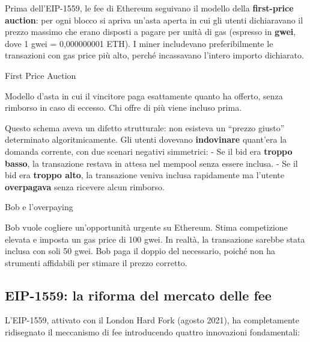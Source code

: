 \documentclass[
  italian,
  openany]{book}
\begin{document}
Prima dell'EIP-1559, le fee di Ethereum seguivano il modello della
\textbf{first-price auction}: per ogni blocco si apriva un'asta aperta
in cui gli utenti dichiaravano il prezzo massimo che erano disposti a
pagare per unità di gas (espresso in \textbf{gwei}, dove 1 gwei =
0,000000001 ETH). I miner includevano preferibilmente le transazioni con
gas price più alto, perché incassavano l'intero importo dichiarato.

\begin{calloutdefinition}{First Price Auction}

Modello d'asta in cui il vincitore paga esattamente quanto ha offerto,
senza rimborso in caso di eccesso. Chi offre di più viene incluso prima.

\end{calloutdefinition}

Questo schema aveva un difetto strutturale: non esisteva un ``prezzo
giusto'' determinato algoritmicamente. Gli utenti dovevano
\textbf{indovinare} quant'era la domanda corrente, con due scenari
negativi simmetrici: - Se il bid era \textbf{troppo basso}, la
transazione restava in attesa nel mempool senza essere inclusa. - Se il
bid era \textbf{troppo alto}, la transazione veniva inclusa rapidamente
ma l'utente \textbf{overpagava} senza ricevere alcun rimborso.

\begin{callouttip}{Bob e l’overpaying}

Bob vuole cogliere un'opportunità urgente su Ethereum. Stima
competizione elevata e imposta un gas price di 100 gwei. In realtà, la
transazione sarebbe stata inclusa con soli 50 gwei. Bob paga il doppio
del necessario, poiché non ha strumenti affidabili per stimare il prezzo
corretto.

\end{callouttip}

\subsection{EIP-1559: la riforma del mercato delle
fee}\label{eip-1559-la-riforma-del-mercato-delle-fee}

L'EIP-1559, attivato con il London Hard Fork (agosto 2021), ha
completamente ridisegnato il meccanismo di fee introducendo quattro
innovazioni fondamentali:
\end{document}
